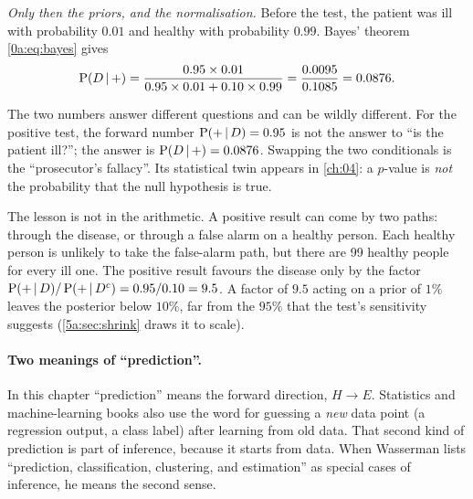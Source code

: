 \emph{Only then the priors, and the normalisation.} Before the test, the
patient was ill with probability $0.01$ and healthy with probability $0.99$.
Bayes' theorem \eqref{0a:eq:bayes} gives
\[
  \operatorname{P}(D\,\vert\, +)=\frac{0.95\times0.01}{0.95\times0.01+0.10\times0.99}
  =\frac{0.0095}{0.1085}=0.0876 .
\]

\begin{pitfall}
The two numbers answer different questions and can be wildly different. For
the positive test, the forward number $\operatorname{P}(+\,\vert\, D)=0.95$ is not the
answer to ``is the patient ill?''; the answer is $\operatorname{P}(D\,\vert\, +)=0.0876$.
Swapping the two conditionals is the ``prosecutor's fallacy''. Its statistical
twin appears in \cref{ch:04}: a $p$-value is \emph{not} the probability that
the null hypothesis is true.
\end{pitfall}

The lesson is not in the arithmetic. A positive result can come by two paths:
through the disease, or through a false alarm on a healthy person. Each
healthy person is unlikely to take the false-alarm path, but there are 99
healthy people for every ill one. The positive result favours the disease only
by the factor $\operatorname{P}(+\,\vert\, D)/\operatorname{P}(+\,\vert\, D^c)=0.95/0.10=9.5$. A factor of
$9.5$ acting on a prior of $1\%$ leaves the posterior below $10\%$, far from
the $95\%$ that the test's sensitivity suggests (\cref{5a:sec:shrink} draws it
to scale).

\paragraph{Two meanings of ``prediction''.}
In this chapter ``prediction'' means the forward direction, $H\to E$.
Statistics and machine-learning books also use the word for guessing a
\emph{new} data point (a regression output, a class label) after learning from
old data. That second kind of prediction is part of inference, because it
starts from data. When Wasserman lists ``prediction, classification,
clustering, and estimation'' as special cases of inference, he means the
second sense.

